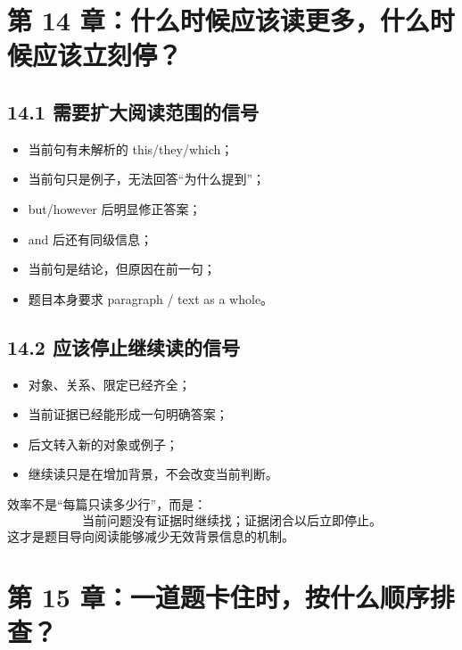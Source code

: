 \documentclass[11pt,a4paper]{ctexart}
\begin{document}
\section{第 14 章：什么时候应该读更多，什么时候应该立刻停？}

\subsection{14.1 需要扩大阅读范围的信号}
\begin{itemize}
  \item 当前句有未解析的 this/they/which；
  \item 当前句只是例子，无法回答“为什么提到”；
  \item but/however 后明显修正答案；
  \item and 后还有同级信息；
  \item 当前句是结论，但原因在前一句；
  \item 题目本身要求 paragraph / text as a whole。
\end{itemize}

\subsection{14.2 应该停止继续读的信号}
\begin{itemize}
  \item 对象、关系、限定已经齐全；
  \item 当前证据已经能形成一句明确答案；
  \item 后文转入新的对象或例子；
  \item 继续读只是在增加背景，不会改变当前判断。
\end{itemize}

\begin{corebox}[阅读效率的真正来源]
效率不是“每篇只读多少行”，而是：
\[
\boxed{
\text{当前问题没有证据时继续找；证据闭合以后立即停止。}
}
\]
这才是题目导向阅读能够减少无效背景信息的机制。
\end{corebox}

\section{第 15 章：一道题卡住时，按什么顺序排查？}
\end{document}
